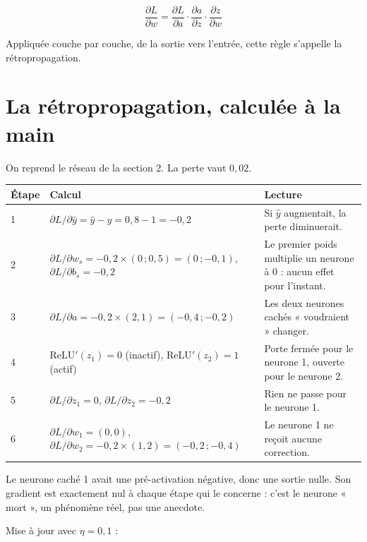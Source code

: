\documentclass[11pt]{article}
\begin{document}
\[ \frac{\partial L}{\partial w} = \frac{\partial L}{\partial a}\cdot\frac{\partial a}{\partial z}\cdot\frac{\partial z}{\partial w} \]

Appliquée couche par couche, de la sortie vers l'entrée, cette règle s'appelle la rétropropagation.

\section{La rétropropagation, calculée à la main}

On reprend le réseau de la section 2. La perte vaut $0{,}02$.

\begin{table}[h]
\centering
\small
\begin{tabular}{p{1cm}p{6cm}p{6.5cm}}
\toprule
Étape & Calcul & Lecture \\
\midrule
1 & $\partial L/\partial \hat y = \hat y - y = 0{,}8-1=-0{,}2$ & Si $\hat y$ augmentait, la perte diminuerait. \\
2 & $\partial L/\partial w_s = -0{,}2\times(0\,;0{,}5)=(0\,;-0{,}1)$, $\partial L/\partial b_s=-0{,}2$ & Le premier poids multiplie un neurone à 0 : aucun effet pour l'instant. \\
3 & $\partial L/\partial a = -0{,}2\times(2,1)=(-0{,}4\,;-0{,}2)$ & Les deux neurones cachés « voudraient » changer. \\
4 & ReLU$'(z_1)=0$ (inactif), ReLU$'(z_2)=1$ (actif) & Porte fermée pour le neurone 1, ouverte pour le neurone 2. \\
5 & $\partial L/\partial z_1 = 0$, $\partial L/\partial z_2 = -0{,}2$ & Rien ne passe pour le neurone 1. \\
6 & $\partial L/\partial w_1 = (0,0)$, $\partial L/\partial w_2 = -0{,}2\times(1,2)=(-0{,}2\,;-0{,}4)$ & Le neurone 1 ne reçoit aucune correction. \\
\bottomrule
\end{tabular}
\end{table}

\begin{remarque}
Le neurone caché 1 avait une pré-activation négative, donc une sortie nulle. Son gradient est exactement nul à chaque étape qui le concerne : c'est le neurone « mort », un phénomène réel, pas une anecdote.
\end{remarque}

Mise à jour avec $\eta=0{,}1$ :
\end{document}
